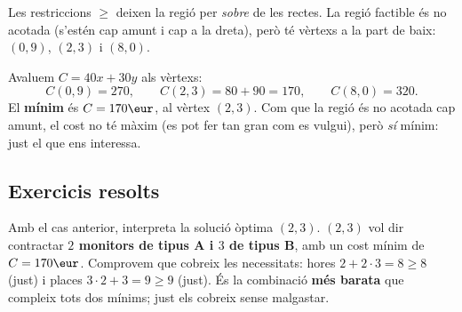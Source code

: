 \begin{exemple}
Les restriccions $\ge$ deixen la regió per \emph{sobre} de les rectes. La regió
factible és no acotada (s'estén cap amunt i cap a la dreta), però té vèrtexs a la part
de baix: $(0,9)$, $(2,3)$ i $(8,0)$.

\begin{center}

\end{center}
\end{exemple}

\begin{exemple}
Avaluem $C=40x+30y$ als vèrtexs:
\[
C(0,9)=270,\qquad C(2,3)=80+90=170,\qquad C(8,0)=320.
\]
El \textbf{mínim} és $C=170\eur$, al vèrtex $(2,3)$. Com que la regió és no acotada cap
amunt, el cost no té màxim (es pot fer tan gran com es vulgui), però \emph{sí} mínim:
just el que ens interessa.
\end{exemple}

\subsection{Exercicis resolts}

\begin{exresolt}
Amb el cas anterior, interpreta la solució òptima $(2,3)$.
\solucio
$(2,3)$ vol dir contractar \textbf{$2$ monitors de tipus A i $3$ de tipus B}, amb un
cost mínim de $C=170\eur$. Comprovem que cobreix les necessitats: hores
$2+2\cdot 3=8\ge 8$ (just) i places $3\cdot 2+3=9\ge 9$ (just). És la combinació
\textbf{més barata} que compleix tots dos mínims; just els cobreix sense malgastar.
\end{exresolt}

